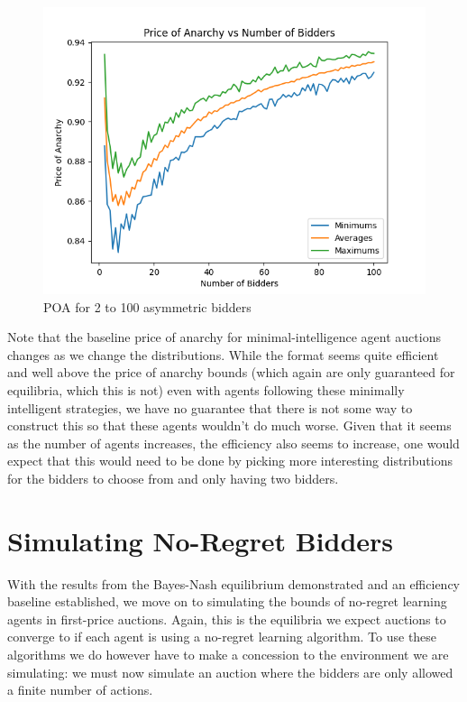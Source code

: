 \documentclass[12pt,twoside]{reedthesis}
\begin{document}
\begin{figure}[h!]
	\centering
	\includegraphics[scale=0.8]{Figures/zi_asymmetric}
	\caption{POA for 2 to 100 asymmetric bidders}
	\label{figure:zi_assymetric}
\end{figure}

Note that the baseline price of anarchy for minimal-intelligence agent auctions changes as we change the distributions. While the format seems quite efficient and well above the price of anarchy bounds (which again are only guaranteed for equilibria, which this is not) even with agents following these minimally intelligent strategies, we have no guarantee that there is not some way to construct this so that these agents wouldn't do much worse. Given that it seems as the number of agents increases, the efficiency also seems to increase, one would expect that this would need to be done by picking more interesting distributions for the bidders to choose from and only having two bidders.

\section{Simulating No-Regret Bidders}
With the results from the Bayes-Nash equilibrium demonstrated and an efficiency baseline established, we move on to simulating the bounds of no-regret learning agents in first-price auctions. Again, this is the equilibria we expect auctions to converge to if each agent is using a no-regret learning algorithm. To use these algorithms we do however have to make a concession to the environment we are simulating: we must now simulate an auction where the bidders are only allowed a finite number of actions.
\end{document}
